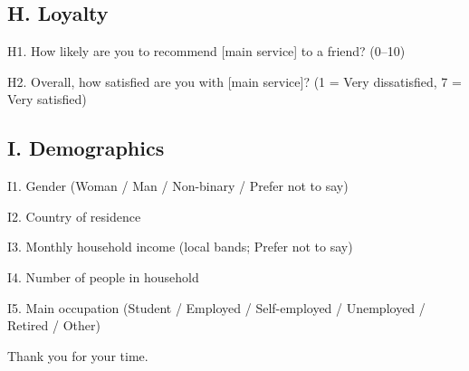 \documentclass[11pt,a4paper]{article}
\begin{document}
\subsection*{H. Loyalty}
H1. How likely are you to recommend [main service] to a friend? (0–10)

H2. Overall, how satisfied are you with [main service]? (1 = Very dissatisfied, 7 = Very satisfied)

\subsection*{I. Demographics}
I1. Gender (Woman / Man / Non-binary / Prefer not to say)

I2. Country of residence

I3. Monthly household income (local bands; Prefer not to say)

I4. Number of people in household

I5. Main occupation (Student / Employed / Self-employed / Unemployed / Retired / Other)

Thank you for your time.
\end{document}
